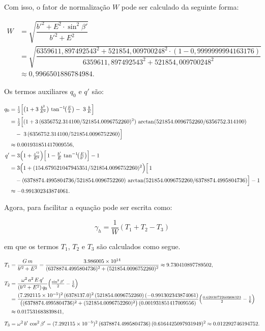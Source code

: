\noindent
Com isso, o fator de normalização \(W\) pode ser calculado da seguinte forma:

\[
\begin{aligned}
   W &= \sqrt{\dfrac{b'^2 + E^2 \cdot \sin^2\beta'}{b'^2 + E^2}} \\
     &= \sqrt{\dfrac{6359611{,}897492543^2 + 521854{,}009700248^2 \cdot (1 - 0{,}9999999994163176)}{6359611{,}897492543^2 + 521854{,}009700248^2}} \\
     &\approx 0{,}9966501886784984 \text{.}
\end{aligned}
\]

\noindent
Os termos auxiliares \(q_0\) e \(q'\) são:

\[
\begin{aligned}
   q_0
   &= \tfrac12\Bigl[\bigl(1 + 3\,\tfrac{b^2}{E^2}\bigr)\,\tan^{-1}\!\bigl(\tfrac{E}{b}\bigr)
   -\;3\,\tfrac{b}{E}\Bigr]\\
   &= \tfrac12\Bigl[(1 + 3\,(6356752.314100/521854.0096752260)^2)\,\arctan(521854.0096752260/6356752.314100) \\
   &\quad -\;3\,(6356752.314100/521854.0096752260)\Bigr]\\
   &\approx 0.001931851417009556,\\
   q'
   &= 3\Bigl(1 + \tfrac{z'^2}{E^2}\Bigr)\Bigl[\,1 
   -\tfrac{b'}{E}\,\tan^{-1}\!\bigl(\tfrac{E}{b'}\bigr)\Bigr]
   -1\\
   &= 3\Bigl(1 + (154.679521047945351/521854.0096752260)^2\Bigr)
   \Bigl[\,1 \\
   &\quad - (6378874.4995804736/521854.0096752260)\,\arctan(521854.0096752260/6378874.4995804736)\Bigr]
   -1\\
   &\approx -0.991302343874061.
\end{aligned}
\]

\noindent
Agora, para facilitar a equação pode ser escrita como:

\[
\gamma_h = \frac{1}{W} \left( T_1 + T_2 - T_3 \right)
\]

\noindent
em que os termos \(T_1\), \(T_2\) e \(T_3\) são calculados como segue.

\[
\begin{aligned}
   T_1 &= \frac{G\,m}{b'^2 + E^2}
   = \frac{3.986005\times10^{14}}{(6378874.4995804736)^2 + (521854.0096752260)^2}
   \approx 9.730410897789502,\\[6pt]
   T_2 &= \frac{\omega^2\,a^2\,E\,q'}{(b'^2 + E^2)\,q_0}
   \Bigl(\tfrac{\sin^2\beta'}{2} - \tfrac{1}{6}\Bigr)\\
   &=\frac{(7.292115\times10^{-5})^2\,(6378137.0)^2\,(521854.0096752260)\,(-0.991302343874061)}
   {\bigl((6378874.4995804736)^2 + (521854.0096752260)^2\bigr)\,(0.001931851417009556)}
   \Bigl(\tfrac{0.6203072260908323}{2} - \tfrac{1}{6}\Bigr)\\
   &\approx 0.017531683839841,\\[6pt]
   T_3 &= \omega^2\,b'\,\cos^2\beta'
   = (7.292115\times10^{-5})^2\,(6378874.4995804736)\,(0.6164425097931949)^2
   \approx 0.012292746194752.
\end{aligned}
\]





